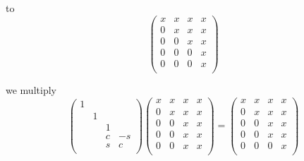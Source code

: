 to 
\begin{equation}
\left(
  \begin{array}{cccc}
    x & x & x & x \\
    0 & x & x & x \\
    0 & 0 & x & x \\
    0 & 0 & 0 & x \\
    0 & 0 & 0 & x \\
  \end{array}
\right)
\end{equation}

we multiply
\begin{equation}
\left(
  \begin{array}{cccc}
    1 &   &   &   \\
      & 1 &   &   \\
      &   & 1 &   \\
      &   & c & -s \\
      &   & s & c \\
  \end{array}
\right)
\left(
  \begin{array}{cccc}
    x & x & x & x \\
    0 & x & x & x \\
    0 & 0 & x & x \\
    0 & 0 & x & x \\
    0 & 0 & x & x \\
  \end{array}
\right)
=
\left(
  \begin{array}{cccc}
    x & x & x & x \\
    0 & x & x & x \\
    0 & 0 & x & x \\
    0 & 0 & x & x \\
    0 & 0 & 0 & x \\
  \end{array}
\right)
\end{equation}



